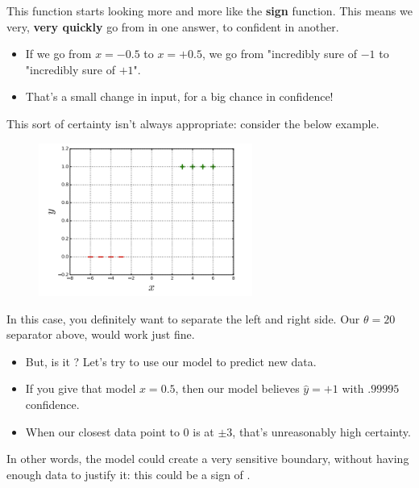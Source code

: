         This function starts looking more and more like the \textbf{sign} function. This means we very, \textbf{very quickly} go from  in one answer, to confident in another.

        \begin{itemize}
            \item If we go from $x=-0.5$ to $x=+0.5$, we go from "incredibly sure of $-1$ to "incredibly sure of $+1$".
            \item That's a small change in input, for a big chance in confidence!
        \end{itemize}
        
        This sort of certainty isn't always appropriate: consider the below example.

        \begin{figure}[H]
            \centering
            \includegraphics[width=70mm,scale=0.5]{images/classification_images/sigmoid_overfit.png}
        \end{figure}

        In this case, you definitely want to separate the left and right side. Our $\theta=20$ separator above, would work just fine. 

        \begin{itemize}
            \item But, is it ? Let's try to use our model to predict new data.
            
            \item If you give that model $x=0.5$, then our model believes $\hat{y} = +1$ with $.99995$ confidence.
            
            \item When our closest data point to 0 is at $\pm 3$, that's unreasonably high certainty.
        \end{itemize}

        In other words, the model could create a very sensitive boundary, without having enough data to justify it: this could be a sign of .
        
